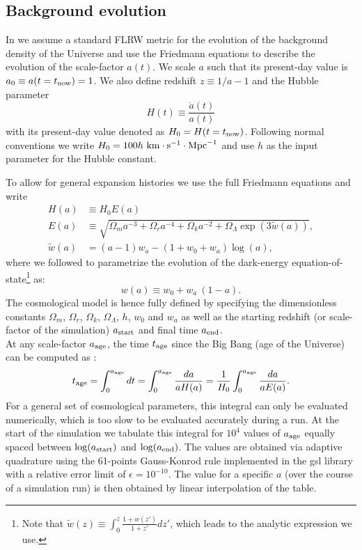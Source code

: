 \subsection{Background evolution}
\label{ssec:flrw}

In \swift we assume a standard FLRW metric for the evolution of the background
density of the Universe and use the Friedmann equations to describe the
evolution of the scale-factor $a(t)$.  We scale $a$ such that its present-day
value is $a_0 \equiv a(t=t_{\rm now}) = 1$. We also define redshift $z \equiv
1/a - 1$ and the Hubble parameter
\begin{equation}
H(t) \equiv \frac{\dot{a}(t)}{a(t)}
\end{equation}
with its present-day value denoted as $H_0 = H(t=t_{\rm now})$. Following
normal conventions we write $H_0 = 100
h~\rm{km}\cdot\rm{s}^{-1}\cdot\rm{Mpc}^{-1}$ and use $h$ as the input parameter
for the Hubble constant.

To allow for general expansion histories we use the full Friedmann equations
and write
\begin{align}
H(a) &\equiv H_0 E(a) \\ E(a) &\equiv\sqrt{\Omega_m a^{-3} + \Omega_r
  a^{-4} + \Omega_k a^{-2} + \Omega_\Lambda \exp\left(3\tilde{w}(a)\right)}, \label{eq:Ea}
\\
\tilde{w}(a) &= (a-1)w_a - (1+w_0 + w_a)\log\left(a\right),
\label{eq:friedmann}
\end{align}
where we followed \cite{Linder2003} to parametrize the evolution of
the dark-energy equation-of-state\footnote{Note that $\tilde{w}(z)\equiv
  \int_0^z \frac{1+w(z')}{1+z'}dz'$, which leads to the analytic
  expression we use.} as:
\begin{equation}
w(a) \equiv w_0 + w_a~(1-a).
\end{equation}
The cosmological model is hence fully defined by specifying the dimensionless
constants $\Omega_m$, $\Omega_r$, $\Omega_k$, $\Omega_\Lambda$, $h$, $w_0$ and
$w_a$ as well as the starting redshift (or scale-factor of the simulation)
$a_{\rm start}$ and final time $a_{\rm end}$. \\ At any scale-factor $a_{\rm
age}$, the time $t_{\rm age}$ since the Big Bang (age of the Universe) can be
computed as \citep[e.g.][]{Wright2006}:
\begin{equation}
  t_{\rm age} = \int_{0}^{a_{\rm age}} dt = \int_{0}^{a_{\rm age}}
  \frac{da}{a H(a)} = \frac{1}{H_0} \int_{0}^{a_{\rm age}}
  \frac{da}{a E(a)}. \label{eq:flrw:age}
\end{equation}
For a general set of cosmological parameters, this integral can only be
evaluated numerically, which is too slow to be evaluated accurately during a
run. At the start of the simulation we tabulate this integral for $10^4$ values
of $a_{\rm age}$ equally spaced between $\log(a_{\rm start})$ and $\log(a_{\rm
end})$. The values are obtained via adaptive quadrature using the 61-points
Gauss-Konrod rule implemented in the {\sc gsl} library \citep{GSL} with a
relative error limit of $\epsilon=10^{-10}$. The value for a specific $a$ (over
the course of a simulation run) is then obtained by linear interpolation of the
table.

